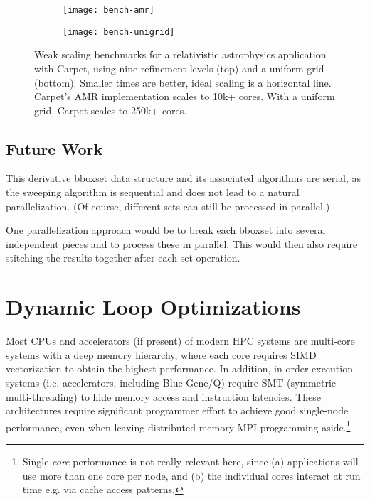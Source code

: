 \documentclass[conference]{IEEEtran}
\begin{document}
\begin{figure}
  \centering
  \begin{subfigure}{\linewidth}
    \centering
    \vspace{-0.7cm}
    \texttt{[image: bench-amr]}
    \vspace{-1.4cm}
  \end{subfigure}
  \begin{subfigure}{\linewidth}
    \centering
    \vspace{-0.7cm}
    \texttt{[image: bench-unigrid]}
    \vspace{-1.3cm}
  \end{subfigure}
  \caption{Weak scaling benchmarks for a relativistic astrophysics
    application with Carpet, using nine refinement levels (top) and a
    uniform grid (bottom). Smaller times are better, ideal scaling is
    a horizontal line. Carpet's AMR implementation scales to 10k+
    cores. With a uniform grid, Carpet scales to 250k+ cores.}
  \label{fig:bench}
\end{figure}

\subsection{Future Work}

This derivative bboxset data structure and its
associated algorithms are serial, as the sweeping algorithm is sequential
and does not lead to a natural parallelization. (Of course, different
sets can still be processed in parallel.)

One parallelization approach would be
to break each bboxset into several independent pieces and to process
these in parallel. This would then also require stitching the
results together after each set operation.



\section{Dynamic Loop Optimizations}
\label{sec:loopcontrol}

Most CPUs and accelerators (if present) of modern HPC
systems are multi-core systems with a deep memory hierarchy, where
each core requires SIMD vectorization to obtain the highest
performance. In addition, in-order-execution systems (i.e.
accelerators, including Blue Gene/Q) require SMT (symmetric
multi-threading) to hide memory access and instruction latencies.
These architectures require significant programmer effort to achieve
good single-node performance, even when leaving distributed memory MPI
programming aside.\footnote{Single-\emph{core} performance is not really relevant here,
  since (a) applications will use more than one core per node, and (b)
  the individual cores interact at run time e.g. via cache access
  patterns.}
\end{document}
